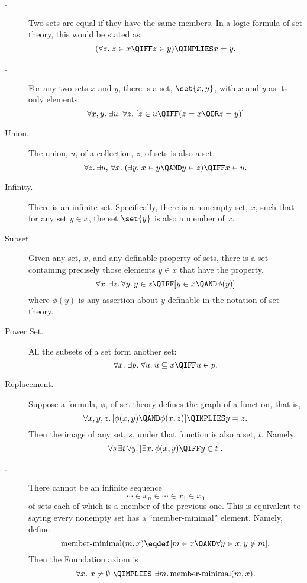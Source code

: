 \begin{description}

\item[.] Two sets are equal if they have the same
  members.  In a logic formula of set theory, this would be stated as:
\[
(\forall z.\; z \in x \QIFF z \in y) \QIMPLIES x = y.
\]

\item[.] For any two sets $x$ and $y$, there is a set,
     $\set{x,y}$, with $x$ and $y$ as its only elements:
\[
\forall x,y.\; \exists u.\; \forall z.\;
[z \in u \QIFF (z = x \QOR z = y)]
\]

\item[Union.] The union, $u$, of a collection, $z$, of sets is also a set:
\[
\forall z.\, \exists u,\, \forall x.\; (\exists y.\; x \in y \QAND y \in z) \QIFF x \in u.
\]

\item[Infinity.]  There is an infinite set.
  Specifically, there is a nonempty set, $x$, such that for any set $y \in
  x$, the set $\set{y}$ is also a member of $x$.


\item[Subset.] Given any set, $x$, and any definable property of sets,
  there is a set containing precisely those elements $y \in x$ that
  have the property.
\[
\forall x.\, \exists z.\, \forall y.\, y \in z \QIFF [y \in x \QAND \phi(y)]
\]
where $\phi(y)$ is any assertion about $y$ definable in the notation
of set theory.

\item[Power Set.]  All the subsets of a set form another set:
\[
\forall x.\; \exists p.\; \forall u.\: u \subseteq x \QIFF u \in p.
\]

\item[Replacement.]  Suppose a formula, $\phi$,
  of set theory defines the graph of a function, that is,
\[
\forall x, y, z.\, [\phi(x,y) \QAND \phi(x,z)] \QIMPLIES y = z.
\]
Then the image of any set, $s$, under that function is also a set, $t$.  Namely,
\[
\forall s\, \exists t\, \forall y.\, [\exists x.\, \phi(x,y) \QIFF y \in t].
\]

\item[.] 
There cannot be an infinite sequence
\[
\cdots \in x_n \in \cdots \in x_1 \in x_0
\]
of sets each of which is a member of the previous one.  This is equivalent
to saying every nonempty set has a ``member-minimal'' element.  Namely, define
\[
\text{member-minimal}(m, x) \eqdef [m \in x \QAND \forall y \in x.\, y \notin m].
\]
Then the Foundation axiom is
\[
\forall x.\ x \neq \emptyset\ \QIMPLIES\ \exists m.\, \text{member-minimal}(m, x).
\]


\end{description}
